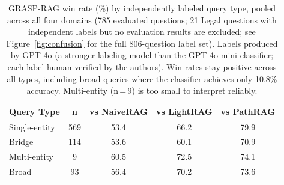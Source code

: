 \begin{table}[t]
\caption{GRASP-RAG win rate (\%) by independently labeled query type,
  pooled across all four domains (785 evaluated questions; 21 Legal questions
  with independent labels but no evaluation results are excluded; see
  Figure~\ref{fig:confusion} for the full 806-question label set).
  Labels produced by GPT-4o (a stronger labeling model than the GPT-4o-mini
  classifier; each label human-verified by the authors). Win rates stay positive across all types,
  including broad queries where the classifier achieves only 10.8\% accuracy.
  Multi-entity (n\,=\,9) is too small to interpret reliably.}
\label{tab:winrate_bytype}
\centering
\renewcommand{\arraystretch}{1.15}
\setlength{\tabcolsep}{3.5pt}
\begin{tabular}{lcccc}
\toprule
\textbf{Query Type} & \textbf{n} & \textbf{vs NaiveRAG} & \textbf{vs LightRAG} & \textbf{vs PathRAG} \\
\midrule
Single-entity & 569 & 53.4 & 66.2 & 79.9 \\
Bridge        & 114 & 53.6 & 60.1 & 70.9 \\
Multi-entity  & 9   & 60.5 & 72.5 & 74.1 \\
Broad         & 93  & 56.4 & 70.2 & 73.6 \\
\bottomrule
\end{tabular}
\end{table}

